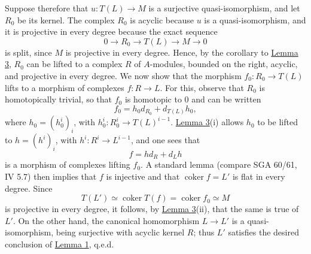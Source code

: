 \documentclass[11pt]{article}
\providecommand{\coker}{\operatorname{coker}}
\providecommand{\coker}{\operatorname{Coker}}
\begin{document}
Suppose therefore that $u:T(L)\to M$ is a surjective quasi-isomorphism, and let $R_0$ be its kernel. The complex $R_0$ is acyclic because $u$ is a quasi-isomorphism, and it is projective in every degree because the exact sequence
\[
0\longrightarrow R_0\longrightarrow T(L)\longrightarrow M\longrightarrow0
\]
is split, since $M$ is projective in every degree. Hence, by the corollary to \hyperref[sga5:XV:lemma:3:2]{Lemma 3}, $R_0$ can be lifted to a complex $R$ of $A$-modules, bounded on the right, acyclic, and projective in every degree. We now show that the morphism $f_0:R_0\to T(L)$ lifts to a morphism of complexes $f:R\to L$. For this, observe that $R_0$ is homotopically trivial, so that $f_0$ is homotopic to $0$ and can be written
\[
f_0=h_0d_{R_0}+d_{T(L)}h_0,
\]
where $h_0=(h_0^i)_i$, with $h_0^i:R_0^i\to T(L)^{i-1}$. \hyperref[sga5:XV:lemma:3:2]{Lemma 3}(i) allows $h_0$ to be lifted to $h=(h^i)_i$, with $h^i:R^i\to L^{i-1}$, and one sees that
\[
f=hd_R+d_Lh
\]
is a morphism of complexes lifting $f_0$. A standard lemma (compare SGA 60/61, IV 5.7) then implies that $f$ is injective and that $\coker f=L'$ is flat in every degree. Since
\[
T(L')\simeq\coker T(f)=\coker f_0\simeq M
\]
is projective in every degree, it follows, by \hyperref[sga5:XV:lemma:3:2]{Lemma 3}(ii), that the same is true of $L'$. On the other hand, the canonical homomorphism $L\to L'$ is a quasi-isomorphism, being surjective with acyclic kernel $R$; thus $L'$ satisfies the desired conclusion of \hyperref[sga5:XV:lemma:1:2]{Lemma 1}, q.e.d.
\end{document}
